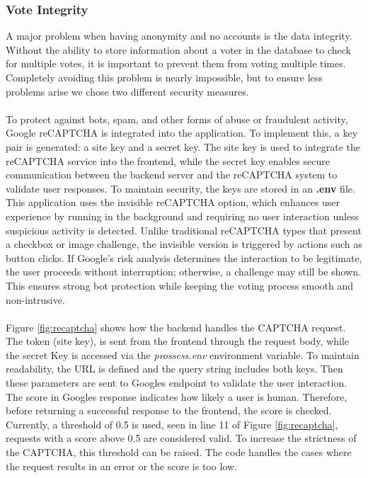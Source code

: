 \documentclass[a4paper,12pt]{report}
\begin{document}
\subsubsection{Vote Integrity}
A major problem when having anonymity and no accounts is the data integrity. Without the ability to store information about a voter in the database to check for multiple votes, it is important to prevent them from voting multiple times. Completely avoiding this problem is nearly impossible, but to ensure less problems arise we chose two different security measures. \\ \\
To protect against bots, spam, and other forms of abuse or fraudulent activity, Google reCAPTCHA is integrated into the application. To implement this, a key pair is generated: a site key and a secret key. The site key is used to integrate the reCAPTCHA service into the frontend, while the secret key enables secure communication between the backend server and the reCAPTCHA system to validate user responses. To maintain security, the keys are stored in an \textbf{.env} file. This application uses the invisible reCAPTCHA option, which enhances user experience by running in the background and requiring no user interaction unless suspicious activity is detected. Unlike traditional reCAPTCHA types that present a checkbox or image challenge, the invisible version is triggered by actions such as button clicks. If Google’s risk analysis determines the interaction to be legitimate, the user proceeds without interruption; otherwise, a challenge may still be shown. This ensures strong bot protection while keeping the voting process smooth and non-intrusive. \parencite{recaptcha} \\ \\
Figure \ref{fig:recaptcha} shows how the backend handles the CAPTCHA request. The token (site key), is sent from the frontend through the request body, while the secret Key is accessed via the \textit{prossess.env} environment variable. To maintain readability, the URL is defined and the query string includes both keys. Then these parameters are sent to Googles endpoint to validate the user interaction. The score in Googles response indicates how likely a user is human. Therefore, before returning a successful response to the frontend, the score is checked. Currently, a threshold of 0.5 is used, seen in line 11 of Figure \ref{fig:recaptcha}, requests with a score above 0.5 are considered valid. To increase the strictness of the CAPTCHA, this threshold can be raised. The code handles the cases where the request results in an error or the score is too low. \parencite{recaptcha}
\end{document}

